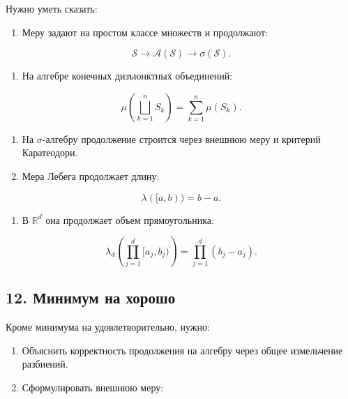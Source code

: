 \documentclass[
  11pt,
  a4paper,
]{article}
\providecommand{\tightlist}{%
  \setlength{\itemsep}{0pt}\setlength{\parskip}{0pt}}
\begin{document}
Нужно уметь сказать:

\begin{enumerate}
\def\labelenumi{\arabic{enumi}.}
\tightlist
\item
  Меру задают на простом классе множеств и продолжают:
\end{enumerate}

\[
\mathcal S\to\mathcal A(\mathcal S)\to\sigma(\mathcal S).
\]

\begin{enumerate}
\def\labelenumi{\arabic{enumi}.}
\setcounter{enumi}{1}
\tightlist
\item
  На алгебре конечных дизъюнктных объединений:
\end{enumerate}

\[
\mu\left(\bigsqcup_{k=1}^nS_k\right)=\sum_{k=1}^n\mu(S_k).
\]

\begin{enumerate}
\def\labelenumi{\arabic{enumi}.}
\setcounter{enumi}{2}
\item
  На \(\sigma\)-алгебру продолжение строится через внешнюю меру и
  критерий Каратеодори.
\item
  Мера Лебега продолжает длину:
\end{enumerate}

\[
\lambda([a,b))=b-a.
\]

\begin{enumerate}
\def\labelenumi{\arabic{enumi}.}
\setcounter{enumi}{4}
\tightlist
\item
  В \(\mathbb R^d\) она продолжает объем прямоугольника:
\end{enumerate}

\[
\lambda_d\left(\prod_{j=1}^d[a_j,b_j)\right)
=
\prod_{j=1}^d(b_j-a_j).
\]

\subsection{12. Минимум на
хорошо}\label{ux43cux438ux43dux438ux43cux443ux43c-ux43dux430-ux445ux43eux440ux43eux448ux43e}

Кроме минимума на удовлетворительно, нужно:

\begin{enumerate}
\def\labelenumi{\arabic{enumi}.}
\tightlist
\item
  Объяснить корректность продолжения на алгебру через общее измельчение
  разбиений.
\item
  Сформулировать внешнюю меру:
\end{enumerate}
\end{document}
